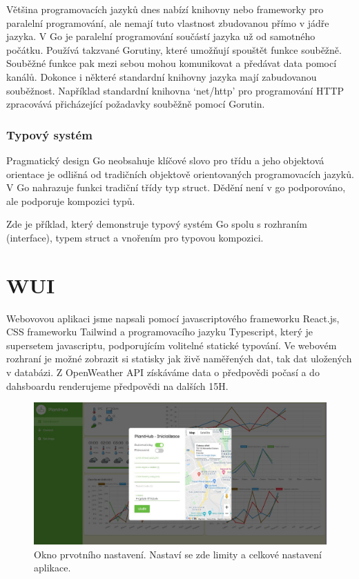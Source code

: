 \documentclass[12pt,a4paper]{article}
\begin{document}
Většina programovacích jazyků dnes nabízí knihovny nebo frameworky pro
paralelní programování, ale nemají tuto vlastnost zbudovanou přímo v jádře
jazyka. V Go je paralelní programování součástí jazyka už od samotného počátku.
Používá takzvané Gorutiny, které umožňují spouštět funkce souběžně. Souběžné
funkce pak mezi sebou mohou komunikovat a předávat data pomocí kanálů. Dokonce
i některé standardní knihovny jazyka mají zabudovanou souběžnost. Například
standardní knihovna `net/http' pro programování HTTP zpracovává přicházející
požadavky souběžně pomocí Gorutin.

\subsubsection{Typový systém}

Pragmatický design Go neobsahuje klíčové slovo pro třídu a jeho objektová
orientace je odlišná od tradičních objektově orientovaných programovacích
jazyků. V Go nahrazuje funkci tradiční třídy typ struct. Dědění není v go
podporováno, ale podporuje kompozici typů.

Zde je příklad, který demonstruje typový systém Go spolu s rozhraním
(interface), typem struct a vnořením pro typovou kompozici.


\clearpage


\section{WUI}

Webovovou aplikaci jsme napsali pomocí javascriptového frameworku
React.js, CSS frameworku
Tailwind a programovacího jazyku Typescript, který je supersetem javascriptu,
podporujícím volitelné statické typování. Ve webovém rozhraní je možné zobrazit
si statisky jak živě
naměřených dat, tak dat uložených v databázi. Z OpenWeather API získáváme data
o předpovědi počasí a do dahsboardu renderujeme předpovědi na dalších 15H.

\begin{figure}[h]
	\centering
	\includegraphics[width=\linewidth]{ui-inicializace.jpg}
	\caption{Okno prvotního nastavení. Nastaví se zde limity a celkové
		nastavení aplikace.}
\end{figure}
\end{document}
